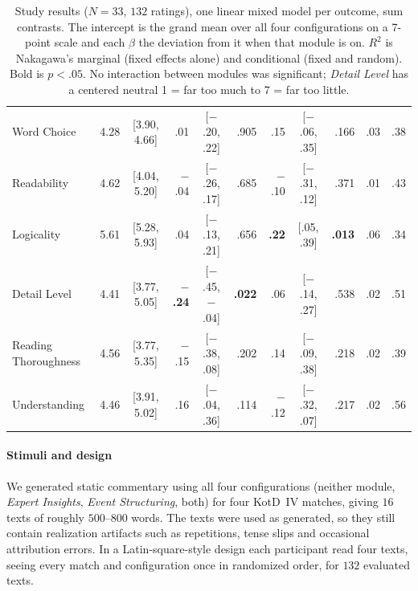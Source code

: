 \documentclass[11pt]{article}
\begin{document}
\begin{table}[t]
\begin{tabular}{@{}l r c r c r r c r r r@{}}
    Word Choice          & 4.28 & [3.90, 4.66] & .01             & [$-$.20, .22]    & .905          & .15          & [$-$.06, .35] & .166          & .03   & .38 \\
    Readability          & 4.62 & [4.04, 5.20] & $-$.04          & [$-$.26, .17]    & .685          & $-$.10       & [$-$.31, .12] & .371          & .01   & .43 \\
    Logicality           & 5.61 & [5.28, 5.93] & .04             & [$-$.13, .21]    & .656          & \textbf{.22} & [.05, .39]    & \textbf{.013} & .06   & .34 \\
    Detail Level         & 4.41 & [3.77, 5.05] & \textbf{$-$.24} & [$-$.45, $-$.04] & \textbf{.022} & .06          & [$-$.14, .27] & .538          & .02   & .51 \\
    Reading Thoroughness & 4.56 & [3.77, 5.35] & $-$.15          & [$-$.38, .08]    & .202          & .14          & [$-$.09, .38] & .218          & .02   & .39 \\
    Understanding        & 4.46 & [3.91, 5.02] & .16             & [$-$.04, .36]    & .114          & $-$.12       & [$-$.32, .07] & .217          & .02   & .56 \\
    \bottomrule
  \end{tabular}
  \caption{Study results ($N=33$, $132$ ratings), one linear mixed model per outcome, sum contrasts. The intercept is the grand mean over all four configurations on a 7-point scale and each $\beta$ the deviation from it when that module is on. $R^2$ is Nakagawa's marginal (fixed effects alone) and conditional (fixed and random). Bold is $p<.05$. No interaction between modules was significant; \emph{Detail Level} has a centered neutral 1 = far too much to 7 = far too little.}
  \label{tab:study}
\end{table}

\paragraph{Stimuli and design}
We generated static commentary using all four configurations (neither module, \emph{Expert Insights}, \emph{Event Structuring}, both) for four KotD~IV matches, giving $16$ texts of roughly $500$--$800$ words. The texts were used as generated, so they still contain realization artifacts such as repetitions, tense slips and occasional attribution errors. In a Latin-square-style design each participant read four texts, seeing every match and configuration once in randomized order, for $132$ evaluated texts.
\end{document}
